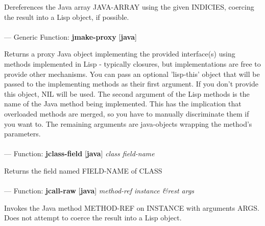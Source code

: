 \begin{adjustwidth}{5em}{5em}
Dereferences the Java array JAVA-ARRAY using the given INDICIES, coercing the result into a Lisp object, if possible.
\end{adjustwidth}

\paragraph{}
\label{JAVA:JMAKE-PROXY}
--- Generic Function: \textbf{jmake-proxy} [\textbf{java}] \textit{}

\begin{adjustwidth}{5em}{5em}
Returns a proxy Java object implementing the provided interface(s) using methods implemented in Lisp - typically closures, but implementations are free to provide other mechanisms. You can pass an optional 'lisp-this' object that will be passed to the implementing methods as their first argument. If you don't provide this object, NIL will be used. The second argument of the Lisp methods is the name of the Java method being implemented. This has the implication that overloaded methods are merged, so you have to manually discriminate them if you want to. The remaining arguments are java-objects wrapping the method's parameters.
\end{adjustwidth}

\paragraph{}
\label{JAVA:JCLASS-FIELD}
--- Function: \textbf{jclass-field} [\textbf{java}] \textit{class field-name}

\begin{adjustwidth}{5em}{5em}
Returns the field named FIELD-NAME of CLASS
\end{adjustwidth}

\paragraph{}
\label{JAVA:JCALL-RAW}
--- Function: \textbf{jcall-raw} [\textbf{java}] \textit{method-ref instance \&rest args}

\begin{adjustwidth}{5em}{5em}
Invokes the Java method METHOD-REF on INSTANCE with arguments ARGS. Does not attempt to coerce the result into a Lisp object.
\end{adjustwidth}

